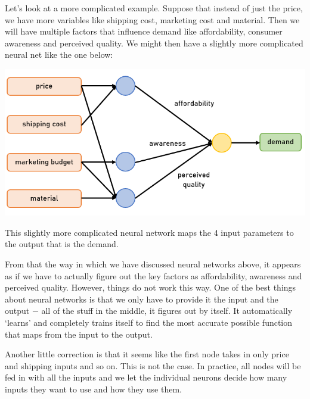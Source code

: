 \documentclass{article}[a4paper,12pt]
\theoremstyle{definition}
\begin{document}
Let's look at a more complicated example. Suppose that instead of just the price, we have more variables like shipping cost, marketing cost and material. Then we will have multiple factors that influence demand like affordability, consumer awareness and perceived quality. We might then have a slightly more complicated neural net like the one below:
\begin{center}\includegraphics{deep_learning2.png}\end{center}
This slightly more complicated neural network maps the 4 input parameters to the output that is the demand.
\vspace{6pt}

From that the way in which we have discussed neural networks above, it appears as if we have to actually figure out the key factors as affordability, awareness and perceived quality. However, things do not work this way. One of the best things about neural networks is that we only have to provide it the input and the output $-$ all of the stuff in the middle, it figures out by itself. It automatically `learns' and completely trains itself to find the most accurate possible function that maps from the input to the output.
\vspace{6pt}

Another little correction is that it seems like the first node takes in only price and shipping inputs and so on. This is not the case. In practice, all nodes will be fed in with all the inputs and we let the individual neurons decide how many inputs they want to use and how they use them.
\end{document}
